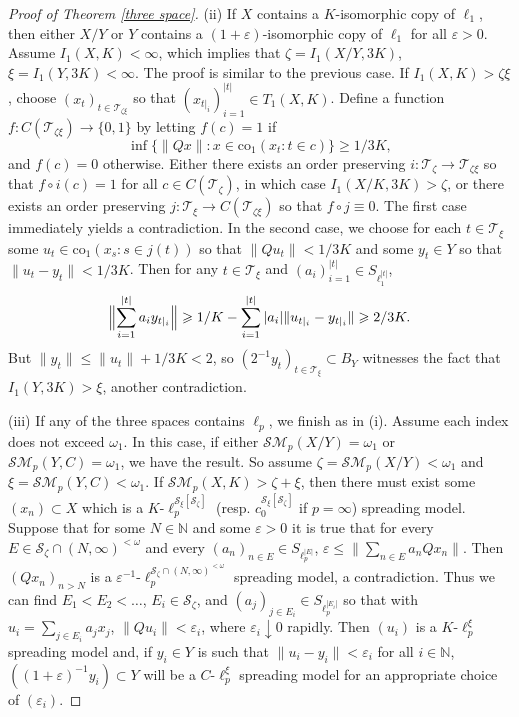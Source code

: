 \documentclass[12pt]{amsart}
\theoremstyle{definition}
\newcommand{\nn}{\mathbb{N}}
\newcommand{\ttt}{\mathcal{T}}
\newcommand{\sss}{\mathcal{S}}
\newcommand{\ssm}{\mathcal{SM}}
\begin{document}
\begin{proof}[Proof of Theorem \ref{three space}]
(ii) If $X$ contains a $K$-isomorphic copy of $\ell_1$, then either $X/Y$ or $Y$ contains a $(1+\varepsilon)$-isomorphic copy of $\ell_1$ for all $\varepsilon>0$.   Assume $I_1(X, K)<\infty$, which implies that $\zeta= I_1(X/Y, 3K)$, $\xi=I_1(Y, 3K)<\infty$.  The proof is similar to the previous case.  If $I_1(X, K)>\zeta\xi$, choose $(x_t)_{t\in \ttt_{\zeta\xi}}$ so that $(x_{t|_i})_{i=1}^{|t|}\in T_1(X,K)$.  Define a function $f:C(\ttt_{\zeta\xi})\to \{0,1\}$ by letting $f(c)=1$ if $$\inf \{\|Qx\|: x\in \text{co}_1(x_t: t\in c)\}\geqslant 1/3K,$$ and $f(c)=0$ otherwise.  Either there exists an order preserving $i:\ttt_\zeta\to \ttt_{\zeta\xi}$ so that $f\circ i(c)=1$ for all $c\in C(\ttt_\zeta)$, in which case $I_1(X/K, 3K)>\zeta$, or there exists an order preserving $j:\ttt_\xi\to C(\ttt_{\zeta\xi})$ so that $f\circ j\equiv 0$.  The first case immediately yields a contradiction.  In the second case, we choose for each $t\in \ttt_\xi$ some $u_t\in \text{co}_1(x_s:s\in j(t))$ so that $\|Qu_t\|<1/3K$ and some $y_t\in Y$ so that $\|u_t-y_t\|<1/3K$.   Then for any $t\in \ttt_\xi$ and $(a_i)_{i=1}^{|t|}\in S_{\ell_1^{|t|}}$, $$\Bigl\|\sum_{i=1}^{|t|} a_i y_{t|_i}\Bigr\|\geqslant 1/K- \sum_{i=1}^{|t|}|a_i| \|u_{t|_i}- y_{t|_i}\| \geqslant 2/3K.$$  But $\|y_t\|\leqslant \|u_t\|+1/3K <2$, so $(2^{-1}y_t)_{t\in \ttt_\xi}\subset B_Y$ witnesses the fact that $I_1(Y, 3K)>\xi$, another contradiction.  



(iii) If any of the three spaces contains $\ell_p$, we finish as in (i).  Assume each index does not exceed $\omega_1$.  In this case, if either $\ssm_p(X/Y)=\omega_1$ or $\ssm_p(Y,C)=\omega_1$, we have the result.  So assume $\zeta= \ssm_p(X/Y)<\omega_1$ and $\xi=\ssm_p(Y, C)<\omega_1$.  If $\ssm_p(X, K)>\zeta+\xi$, then there must exist some $(x_n)\subset X$ which is a $K$-$\ell_p^{\sss_\xi[\sss_\zeta]}$ (resp. $c_0^{\sss_\xi[\sss_\zeta]}$ if $p=\infty$) spreading model.  Suppose that for some $N\in \nn$ and some $\varepsilon>0$ it is true that for every $E\in \sss_\zeta\cap (N, \infty)^{<\omega}$ and every $(a_n)_{n\in E}\in S_{\ell_p^{|E|}}$, $\varepsilon \leqslant \|\sum_{n\in E} a_n Qx_n\|$.  Then $(Qx_n)_{n>N}$ is a $\varepsilon^{-1}$-$\ell_p^{\sss_\zeta\cap (N, \infty)^{<\omega}}$ spreading model, a contradiction.  Thus we can find $E_1<E_2<\ldots$, $E_i\in \sss_\zeta$, and $(a_j)_{j\in E_i}\in S_{\ell_p^{|E_i|}}$ so that with $u_i=\sum_{j\in E_i} a_j x_j$, $\|Qu_i\|<\varepsilon_i$, where $\varepsilon_i\downarrow 0$ rapidly.  Then $(u_i)$ is a $K$-$\ell_p^\xi$ spreading model and, if $y_i\in Y$ is such that $\|u_i-y_i\|<\varepsilon_i$ for all $i\in \nn$, $((1+\varepsilon)^{-1}y_i)\subset Y$ will be a $C$-$\ell_p^\xi$ spreading model for an appropriate choice of $(\varepsilon_i)$.  



\end{proof}
\end{document}
